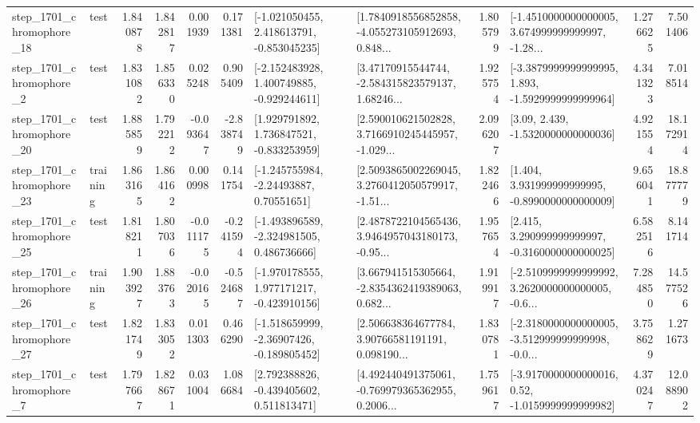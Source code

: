 \begin{tabular}{llrrrrllrlrr}
 step\_1701\_chromophore\_18 &      test &      1.840878 &    1.842817 &      0.001939 &  0.171381 &   [-1.021050455, 2.418613791, -0.853045235] &  [1.7840918556852858, -4.055273105912693, 0.848... &       1.805799 &  [-1.4510000000000005, 3.674999999999997, -1.28... &            1.276625 &          7.501406 \\
  step\_1701\_chromophore\_2 &      test &      1.831082 &    1.856330 &      0.025248 &  0.905409 &   [-2.152483928, 1.400749885, -0.929244611] &  [3.47170915544744, -2.584315823579137, 1.68246... &       1.925754 &  [-3.3879999999999995, 1.893, -1.5929999999999964] &            4.341323 &          7.018514 \\
 step\_1701\_chromophore\_20 &      test &      1.885859 &    1.792212 &     -0.093647 & -2.838749 &    [1.929791892, 1.736847521, -0.833253959] &  [2.590010621502828, 3.7166910245445957, -1.029... &       2.096207 &                 [3.09, 2.439, -1.5320000000000036] &            4.921554 &         18.172914 \\
 step\_1701\_chromophore\_23 &  training &      1.863165 &    1.864162 &      0.000998 &  0.141754 &     [-1.245755984, -2.24493887, 0.70551651] &  [2.5093865002269045, 3.2760412050579917, -1.51... &       1.822466 &    [1.404, 3.931999999999995, -0.8990000000000009] &            9.656041 &         18.877779 \\
 step\_1701\_chromophore\_25 &      test &      1.818211 &    1.807036 &     -0.011175 & -0.241594 &   [-1.493896589, -2.324981505, 0.486736666] &  [2.4878722104565436, 3.9464957043180173, -0.95... &       1.957654 &    [2.415, 3.290999999999997, -0.3160000000000025] &            6.582516 &          8.141714 \\
 step\_1701\_chromophore\_26 &  training &      1.903927 &    1.883763 &     -0.020165 & -0.524687 &   [-1.970178555, 1.977171217, -0.423910156] &  [3.667941515305664, -2.8354362419389063, 0.682... &       1.919917 &  [-2.5109999999999992, 3.2620000000000005, -0.6... &            7.284850 &         14.577526 \\
 step\_1701\_chromophore\_27 &      test &      1.821749 &    1.833052 &      0.011303 &  0.466290 &   [-1.518659999, -2.36907426, -0.189805452] &  [2.506638364677784, 3.90766581191191, 0.098190... &       1.830781 &  [-2.3180000000000005, -3.512999999999998, -0.0... &            3.758629 &          1.271673 \\
  step\_1701\_chromophore\_7 &      test &      1.797667 &    1.828671 &      0.031004 &  1.086684 &    [2.792388826, -0.439405602, 0.511813471] &  [4.492440491375061, -0.769979365362955, 0.2006... &       1.759617 &   [-3.9170000000000016, 0.52, -1.0159999999999982] &            4.370247 &         12.088902 \\

\end{tabular}
